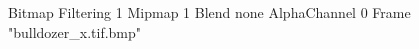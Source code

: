 {Bitmap
	{Filtering 1}
	{Mipmap 1}
	{Blend none}
	{AlphaChannel 0}
	{Frame "bulldozer_x.tif.bmp"}
}
